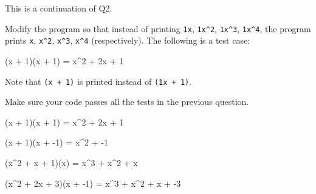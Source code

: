This is a continuation of Q2.

Modify the program so that instead of printing 
\verb!1x!, 
\verb!1x^2!, 
\verb!1x^3!, 
\verb!1x^4!, the program prints 
\verb!x!, \verb!x^2!, \verb!x^3!, \verb!x^4! 
(respectively). 
The following is a test case:
\begin{console}[commandchars=\\\{\}]
(x + 1)(x + 1) = x^2 + 2x + 1
\end{console}
Note that \verb!(x + 1)! is printed instead of  \verb!(1x + 1)!.

Make sure your code passes all the tests in the previous question.

\resett
\nextt
\begin{console}[commandchars=\\\{\}]
(x + 1)(x + 1) = x^2 + 2x + 1
\end{console}

\nextt
\begin{console}[commandchars=\\\{\}]
(x + 1)(x + -1) = x^2 + -1
\end{console}

\nextt
\begin{console}[commandchars=\\\{\}]
(x^2 + x + 1)(x) = x^3 + x^2 + x
\end{console}

\nextt
\begin{console}[commandchars=\\\{\}]
(x^2 + 2x + 3)(x + -1) = x^3 + x^2 + x + -3
\end{console}
